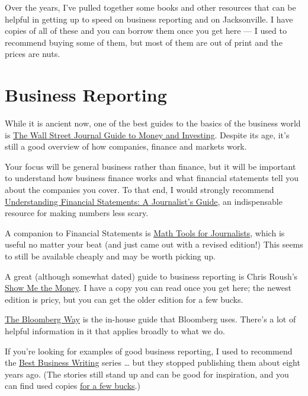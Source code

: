\documentclass[
  11pt,
  american,
  letterpaperpaper,
  extrafontsizes,onecolumn,openright
  ]{memoir}
\begin{document}
Over the years, I've pulled together some books and other resources that can be helpful in getting up to speed on business reporting and on Jacksonville. I have copies of all of these and you can borrow them once you get here --- I used to recommend buying some of them, but most of them are out of print and the prices are nuts.

\hypertarget{business-reporting}{%
\section*{Business Reporting}\label{business-reporting}}

While it is ancient now, one of the best guides to the basics of the business world is \href{https://www.amazon.com/Street-Journal-Guide-Understanding-Investing/dp/0684869020}{The Wall Street Journal Guide to Money and Investing}. Despite its age, it's still a good overview of how companies, finance and markets work.

Your focus will be general business rather than finance, but it will be important to understand how business finance works and what financial statements tell you about the companies you cover. To that end, I would strongly recommend \href{https://www.amazon.com/Understanding-Financial-Statements-Journalists-Guide/dp/0972993738/ref=sr_1_1}{Understanding Financial Statements: A Journalist's Guide}, an indispensable resource for making numbers less scary.

A companion to Financial Statements is \href{https://www.amazon.com/Math-Tools-Journalists-Kathleen-Wickham/dp/0916242919/ref=sr_1_2}{Math Tools for Journalists}, which is useful no matter your beat (and just came out with a revised edition!) This seems to still be available cheaply and may be worth picking up.

A great (although somewhat dated) guide to business reporting is Chris Roush's \href{https://www.amazon.com/Show-Money-Economics-Communication-Routledge/dp/0805849556/ref=tmm_pap_swatch_0}{Show Me the Money}. I have a copy you can read once you get here; the newest edition is pricy, but you can get the older edition for a few bucks.

\href{https://www.amazon.com/Bloomberg-Way-Guide-Reporters-Editors/dp/1118030176/ref=sr_1_1}{The Bloomberg Way} is the in-house guide that Bloomberg uses. There's a lot of helpful information in it that applies broadly to what we do.

If you're looking for examples of good business reporting, I used to recommend the \href{https://www.foxtalebookshoppe.com/search/Starkman\%2C\%20Dean?type=author}{Best Business Writing} series \ldots{} but they stopped publishing them about eight years ago. (The stories still stand up and can be good for inspiration, and you can find used copies \href{https://www.amazon.com/s?k=starkman+dean\&crid=180T8U6GUGQ50\&sprefix=starkman+dean\%2Caps\%2C88\&ref=nb_sb_noss}{for a few bucks}.)
\end{document}
